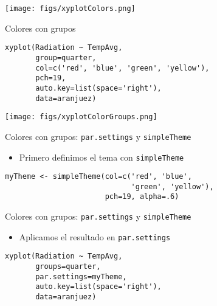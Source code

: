 \documentclass[aspectratio=169, usenames,svgnames,dvipsnames]{beamer}
\begin{document}
\begin{frame}[label={sec:orgd37e0cb}]{}
\begin{center}
\texttt{[image: figs/xyplotColors.png]}
\end{center}
\end{frame}

\begin{frame}[label={sec:orgf696e37},fragile]{Colores con grupos}
 \lstset{language=r,label= ,caption= ,captionpos=b,numbers=none}
\begin{lstlisting}
xyplot(Radiation ~ TempAvg,
       group=quarter,
       col=c('red', 'blue', 'green', 'yellow'),
       pch=19,
       auto.key=list(space='right'),
       data=aranjuez)
\end{lstlisting}
\end{frame}

\begin{frame}[label={sec:org54c514f}]{}
\begin{center}
\texttt{[image: figs/xyplotColorGroups.png]}
\end{center}
\end{frame}

\begin{frame}[label={sec:org6078d79},fragile]{Colores con grupos: \texttt{par.settings} y \texttt{simpleTheme}}
 \begin{itemize}
\item Primero definimos el tema con \texttt{simpleTheme}
\end{itemize}
\lstset{language=r,label= ,caption= ,captionpos=b,numbers=none}
\begin{lstlisting}
myTheme <- simpleTheme(col=c('red', 'blue',
                             'green', 'yellow'),
                       pch=19, alpha=.6)
\end{lstlisting}
\end{frame}

\begin{frame}[label={sec:org7ab7b56},fragile]{Colores con grupos: \texttt{par.settings} y \texttt{simpleTheme}}
 \begin{itemize}
\item Aplicamos el resultado en \texttt{par.settings}
\end{itemize}
\lstset{language=r,label= ,caption= ,captionpos=b,numbers=none}
\begin{lstlisting}
xyplot(Radiation ~ TempAvg,
       groups=quarter,
       par.settings=myTheme,
       auto.key=list(space='right'),
       data=aranjuez)
\end{lstlisting}
\end{frame}
\end{document}
